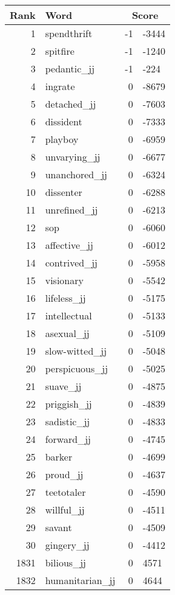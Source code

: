 \begin{longtable}[!htbp]{| rlr@{.}l |}
    \hline
    \textbf{Rank} & \textbf{Word} & \multicolumn{2}{c|}{\textbf{Score}} \\
    \hline
    \endhead
    1 & spendthrift & -1 & -3444 \\
    2 & spitfire & -1 & -1240 \\
    3 & pedantic\_jj & -1 & -224 \\
    4 & ingrate & 0 & -8679 \\
    5 & detached\_jj & 0 & -7603 \\
    6 & dissident & 0 & -7333 \\
    7 & playboy & 0 & -6959 \\
    8 & unvarying\_jj & 0 & -6677 \\
    9 & unanchored\_jj & 0 & -6324 \\
    10 & dissenter & 0 & -6288 \\
    11 & unrefined\_jj & 0 & -6213 \\
    12 & sop & 0 & -6060 \\
    13 & affective\_jj & 0 & -6012 \\
    14 & contrived\_jj & 0 & -5958 \\
    15 & visionary & 0 & -5542 \\
    16 & lifeless\_jj & 0 & -5175 \\
    17 & intellectual & 0 & -5133 \\
    18 & asexual\_jj & 0 & -5109 \\
    19 & slow-witted\_jj & 0 & -5048 \\
    20 & perspicuous\_jj & 0 & -5025 \\
    21 & suave\_jj & 0 & -4875 \\
    22 & priggish\_jj & 0 & -4839 \\
    23 & sadistic\_jj & 0 & -4833 \\
    24 & forward\_jj & 0 & -4745 \\
    25 & barker & 0 & -4699 \\
    26 & proud\_jj & 0 & -4637 \\
    27 & teetotaler & 0 & -4590 \\
    28 & willful\_jj & 0 & -4511 \\
    29 & savant & 0 & -4509 \\
    30 & gingery\_jj & 0 & -4412 \\
    1831 & bilious\_jj & 0 & 4571 \\
    1832 & humanitarian\_jj & 0 & 4644 \\

\end{longtable}
